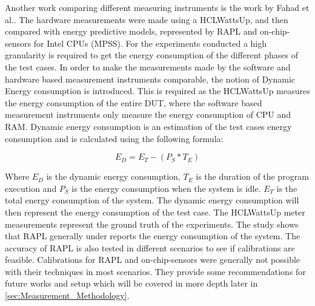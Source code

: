 Another work comparing different measuring instruments is the work by Fahad et al.\cite{fahad2019comparative}. The hardware measurements were made using a HCLWattsUp, and then compared with energy predictive models, represented by RAPL and on-chip-sensors for Intel CPUs (MPSS). For the experiments conducted a high granularity is required to get the energy consumption of the different phases of the test cases. In order to make the measurements made by the software and hardware based measurement instruments comparable, the notion of Dynamic Energy consumption is introduced. This is required as the HCLWattsUp measures the energy consumption of the entire DUT, where the software based measurement instruments only measure the energy consumption of CPU and RAM. Dynamic energy consumption is an estimation of the test cases energy consumption and is calculated using the following formula:\cite{fahad2019comparative}

\begin{equation}\label{eq:dynamicEnergy}
    E_D = E_T - (P_S * T_E)
\end{equation}

Where $E_D$ is the dynamic energy consumption, $T_E$ is the duration of the program execution and $P_S$ is the energy consumption when the system is idle. $E_T$ is the total energy consumption of the system. The dynamic energy consumption will then represent the energy consumption of the test case. The HCLWattsUp meter measurements represent the ground truth of the experiments. The study shows that RAPL generally under reports the energy consumption of the system. The accuracy of RAPL is also tested in different scenarios to see if calibrations are feasible. Calibrations for RAPL and on-chip-sensors were generally not possible with their techniques in most scenarios. They provide some recommendations for future works and setup which will be covered in more depth later in \cref{sec:Measurement_Methodology}.